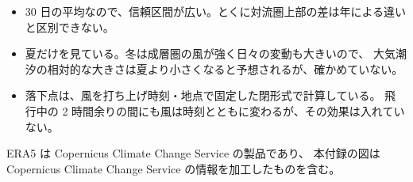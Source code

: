 \begin{itemize}
  \item 30 日の平均なので、信頼区間が広い。とくに対流圏上部の差は年による違いと区別できない。
  \item 夏だけを見ている。冬は成層圏の風が強く日々の変動も大きいので、
        大気潮汐の相対的な大きさは夏より小さくなると予想されるが、確かめていない。
  \item 落下点は、風を打ち上げ時刻・地点で固定した閉形式で計算している。
        飛行中の 2 時間余りの間にも風は時刻とともに変わるが、その効果は入れていない。
\end{itemize}

ERA5 は Copernicus Climate Change Service の製品であり、
本付録の図は Copernicus Climate Change Service の情報を加工したものを含む。

